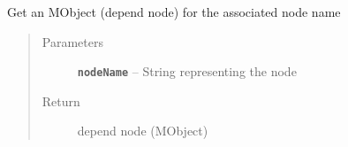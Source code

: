 \documentclass[letterpaper,10pt,english]{sphinxmanual}
\begin{document}

\begin{fulllineitems}
\label{zBuilder:zBuilder.zMaya.getDependNode}
Get an MObject (depend node) for the associated node name
\begin{quote}\begin{description}
\item[{Parameters}] \leavevmode
\textbf{\texttt{nodeName}} -- String representing the node

\item[{Return}] \leavevmode
depend node (MObject)

\end{description}\end{quote}

\end{fulllineitems}


\begin{fulllineitems}
\label{zBuilder:zBuilder.zMaya.get_association}
\end{fulllineitems}


\begin{fulllineitems}
\label{zBuilder:zBuilder.zMaya.get_type}
\end{fulllineitems}


\begin{fulllineitems}
\label{zBuilder:zBuilder.zMaya.get_zAttachments}
\end{fulllineitems}


\begin{fulllineitems}
\label{zBuilder:zBuilder.zMaya.get_zBones}
\end{fulllineitems}
\end{document}
